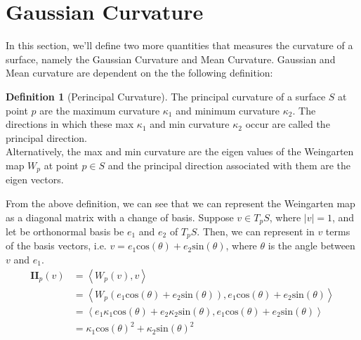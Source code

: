 \documentclass{article}
\theoremstyle{plain}
\theoremstyle{definition}
\newtheorem{definition}{Definition}
\theoremstyle{remark}
\begin{document}

\section{Gaussian Curvature}
In this section, we'll define two more quantities that measures the curvature of a surface, namely the Gaussian Curvature and Mean Curvature. Gaussian and Mean curvature are dependent on the the following definition:

\begin{definition}[Perincipal Curvature]
    The principal curvature of a surface \( S\) at point \(p\) are the maximum curvature \(\kappa_1\) and minimum curvature \( \kappa_2 \). The directions in which these max \(\kappa_1\) and min curvature \(\kappa_2\) occur are called the principal direction. \\
    Alternatively, the max and min curvature are the eigen values of the Weingarten map \( W_p\) at point \(p \in S\) and the principal direction associated with them are the eigen vectors.
\end{definition}

From the above definition, we can see that we can represent the Weingarten map as a diagonal matrix with a change of basis. Suppose \(v \in T_pS\), where \(|v| = 1\), and let be orthonormal basis be  \( e_1 \) and \( e_2 \) of \( T_pS\). Then, we can represent in \(v\) terms of the basis vectors, i.e. \( v = e_1 \text{cos}(\theta) + e_2 \text{sin}(\theta)\), where \( \theta \) is the angle between \( v\) and \( e_1\).
\begin{align*}
    \mathbf{II}_p(v) & = \left\langle W_p(v), v\right\rangle                                                                              \\
                     & = \left\langle W_p(e_1 \text{cos}(\theta) + e_2 \text{sin}(\theta)), e_1 \text{cos}(\theta) + e_2 \text{sin}(\theta) \right\rangle             \\
                     & = \left\langle e_1 \kappa_1 \text{cos}(\theta) + e_2 \kappa_2 \text{sin}(\theta), e_1 \text{cos}(\theta) + e_2 \text{sin}(\theta)\right\rangle \\
                     & = \kappa_1 \text{cos}(\theta)^2 + \kappa_2 \text{sin}(\theta)^2
\end{align*}
\end{document}
